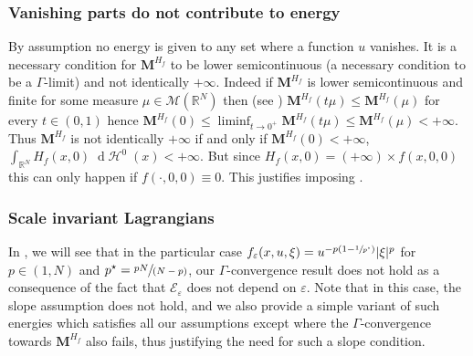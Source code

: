 \documentclass[10pt]{amsart}
\newcommand{\spfrac}[2]{{\sfrac{#1}{(#2)}}}
\theoremstyle{plain}
\theoremstyle{definition}
\newcommand{\dd}{\mathop{}\mathopen{}\mathrm{d}}
\newcommand{\R}{\mathbb{R}}
\newcommand{\Mspace}{\mathscr{M}}
\newcommand{\mass}{\boldsymbol{M}}
\DeclarePairedDelimiter{\abs}{\lvert}{\rvert}
\DeclareMathOperator{\hdm}{\mathcal{H}}
\begin{document}
\subsubsection*{Vanishing parts do not contribute to energy}
By assumption  no energy is given to any set where a function $u$ vanishes. It is a necessary condition for $\mass^{H_f}$ to be lower semicontinuous (a necessary condition to be a $\Gamma$-limit) and not identically $+\infty$. Indeed if $\mass^{H_f}$ is lower semicontinuous and finite for some measure $\mu \in \Mspace(\R^N)$ then (see ) $\mass^{H_f}(t \mu) \leq \mass^{H_f}(\mu)$ for every $t\in (0,1)$ hence $\mass^{H_f}(0) \leq \liminf_{t\to 0^+} \mass^{H_f}(t\mu) \leq \mass^{H_f}(\mu) <+\infty$. Thus $\mass^{H_f}$ is not identically $+\infty$ if and only if $\mass^{H_f}(0) < +\infty$, \ie $\int_{\R^N} H_f(x,0)\dd\hdm^0(x) < +\infty$. But since $H_f(x,0) = (+\infty) \times f(x,0,0)$ this can only happen if $f(\cdot,0,0) \equiv 0$. This justifies imposing .

\subsubsection*{Scale invariant Lagrangians} In , we will see that in the particular case \(f_\varepsilon(x,u,\xi)=u^{-p(1-\sfrac{1}{p^\star})}\abs{\xi}^p\) for \(p\in (1,N)\) and \(p^\star=\spfrac{pN}{N-p}\), our \(\Gamma\)-convergence result does not hold as a consequence of the fact that \(\mathcal{E}_\varepsilon\) does not depend on \(\varepsilon\). Note that in this case, the slope assumption  does not hold, and we also provide a simple variant of such energies which satisfies all our assumptions except  where the $\Gamma$-convergence towards $\mass^{H_f}$ also fails, thus justifying the need for such a slope condition.
\end{document}
